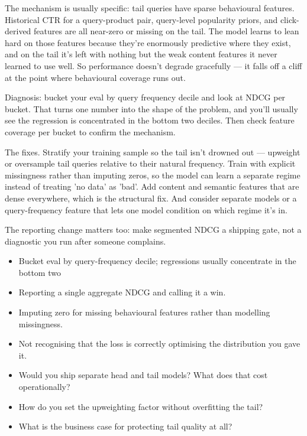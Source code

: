 \documentclass[10pt,twoside]{book}
\newcommand{\lab}[1]{\par\vspace{5pt}\noindent{\sffamily\footnotesize\bfseries\color{accent}#1}\par\vspace{1pt}}
\newcommand{\flab}[1]{\par\vspace{5pt}\noindent{\sffamily\footnotesize\bfseries\color{flag}#1}\par\vspace{1pt}}
\begin{document}
The mechanism is usually specific: tail queries have sparse behavioural features. Historical CTR for a query-product pair, query-level popularity priors, and click-derived features are all near-zero or missing on the tail. The model learns to lean hard on those features because they're enormously predictive where they exist, and on the tail it's left with nothing but the weak content features it never learned to use well. So performance doesn't degrade gracefully --- it falls off a cliff at the point where behavioural coverage runs out.\par\vspace{3pt}
Diagnosis: bucket your eval by query frequency decile and look at NDCG per bucket. That turns one number into the shape of the problem, and you'll usually see the regression is concentrated in the bottom two deciles. Then check feature coverage per bucket to confirm the mechanism.\par\vspace{3pt}
The fixes. Stratify your training sample so the tail isn't drowned out --- upweight or oversample tail queries relative to their natural frequency. Train with explicit missingness rather than imputing zeros, so the model can learn a separate regime instead of treating 'no data' as 'bad'. Add content and semantic features that are dense everywhere, which is the structural fix. And consider separate models or a query-frequency feature that lets one model condition on which regime it's in.\par\vspace{3pt}
The reporting change matters too: make segmented NDCG a shipping gate, not a diagnostic you run after someone complains.\par\vspace{3pt}
\lab{Numbers}
\begin{itemize}
\item Bucket eval by query-frequency decile; regressions usually concentrate in the bottom two
\end{itemize}
\flab{Loses the signal}
\begin{itemize}
\item Reporting a single aggregate NDCG and calling it a win.
\item Imputing zero for missing behavioural features rather than modelling missingness.
\item Not recognising that the loss is correctly optimising the distribution you gave it.
\end{itemize}
\lab{Then they ask}
\begin{itemize}
\item Would you ship separate head and tail models? What does that cost operationally?
\item How do you set the upweighting factor without overfitting the tail?
\item What is the business case for protecting tail quality at all?
\end{itemize}
\end{document}
